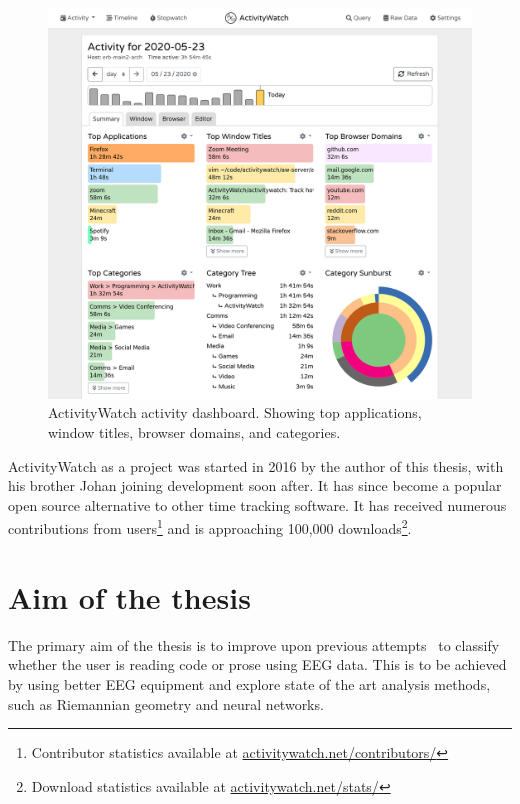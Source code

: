 
        \begin{figure}[h]
        \centering
        \includegraphics[width=12cm]{img/screenshot-aw-activity.png}
        \caption{ActivityWatch activity dashboard. Showing top applications, window titles, browser domains, and categories.}\label{fig:aw}
        \end{figure}

        ActivityWatch as a project was started in 2016 by the author of this thesis, with his brother Johan joining development soon after. It has since become a popular open source alternative to other time tracking software. It has received numerous contributions from users\footnote{Contributor statistics available at \href{https://activitywatch.net/contributors/}{activitywatch.net/contributors/}} and is approaching 100,000 downloads\footnote{Download statistics available at \href{https://activitywatch.net/stats/}{activitywatch.net/stats/}}.


\section{Aim of the thesis}


    The primary aim of the thesis is to improve upon previous attempts~\cite{fucci_replication_2019} to classify whether the user is reading code or prose using EEG data. This is to be achieved by using better EEG equipment and explore state of the art analysis methods, such as Riemannian geometry and neural networks.

